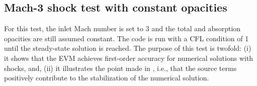 \documentclass[times,doublespace]{fldauth}%
\begin{document}
\subsection{Mach-3 shock test with constant opacities}\label{sec:mach-3-cst-xs}
%
For this test, the inlet Mach number is set to $3$ and the total and absorption opacities are still assumed constant. 
The code is run with a CFL condition of 1 until the steady-state solution is reached. The purpose of this test is twofold: (i) it shows that the EVM achieves first-order accuracy for numerical solutions with shocks, and, (ii) it illustrates the point made in , i.e., that the source terms positively contribute to the stabilization of the numerical solution.
\end{document}
